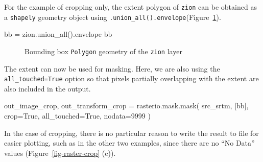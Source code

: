 \documentclass[
  letterpaper,
]{krantz}
\newenvironment{Shaded}{\begin{snugshade}}{\end{snugshade}}
\newcommand{\DecValTok}[1]{\textcolor[rgb]{0.68,0.00,0.00}{#1}}
\newcommand{\NormalTok}[1]{\textcolor[rgb]{0.00,0.23,0.31}{#1}}
\newcommand{\OperatorTok}[1]{\textcolor[rgb]{0.37,0.37,0.37}{#1}}
\newcommand{\VariableTok}[1]{\textcolor[rgb]{0.07,0.07,0.07}{#1}}
\begin{document}
For the example of cropping only, the extent polygon of \texttt{zion}
can be obtained as a \texttt{shapely} geometry object using
\texttt{.union\_all().envelope}(Figure~\ref{fig-zion-bbox}).

\begin{Shaded}
\begin{Highlighting}[]
\NormalTok{bb }\OperatorTok{=}\NormalTok{ zion.union\_all().envelope}
\NormalTok{bb}
\end{Highlighting}
\end{Shaded}

\begin{figure}[H]


\caption{\label{fig-zion-bbox}Bounding box
\texttt{\textquotesingle{}Polygon\textquotesingle{}} geometry of the
\texttt{zion} layer}

\end{figure}%

The extent can now be used for masking. Here, we are also using the
\texttt{all\_touched=True} option so that pixels partially overlapping
with the extent are also included in the output.

\begin{Shaded}
\begin{Highlighting}[]
\NormalTok{out\_image\_crop, out\_transform\_crop }\OperatorTok{=}\NormalTok{ rasterio.mask.mask(}
\NormalTok{    src\_srtm, }
\NormalTok{    [bb], }
\NormalTok{    crop}\OperatorTok{=}\VariableTok{True}\NormalTok{, }
\NormalTok{    all\_touched}\OperatorTok{=}\VariableTok{True}\NormalTok{, }
\NormalTok{    nodata}\OperatorTok{=}\DecValTok{9999}
\NormalTok{)}
\end{Highlighting}
\end{Shaded}

In the case of cropping, there is no particular reason to write the
result to file for easier plotting, such as in the other two examples,
since there are no ``No Data'' values (Figure~\ref{fig-raster-crop}
(c)).
\end{document}
